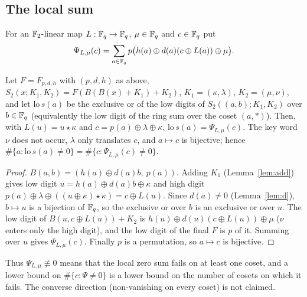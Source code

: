 \subsection{The local sum}
For an $\mathbb{F}_2$-linear map $L:\mathbb{F}_q\to\mathbb{F}_q$, $\mu\in\mathbb{F}_q$ and $c\in\mathbb{F}_q$ put
\[
\Psi_{L,\mu}(c)=\sum_{a\in\mathbb{F}_q}p\bigl(h(a)\oplus d(a)(c\oplus L(a))\oplus\mu\bigr).
\]
\begin{proposition}\label{dz:prop:link}
Let $F=F_{p,d,h}$ with $(p,d,h)$ as above, $S_2(x;K_1,K_2)=F(B(B(x)+K_1)+K_2)$, $K_1=(\kappa,\lambda)$,
$K_2=(\mu,\nu)$, and let $\mathrm{lo}\,s(a)$ be the exclusive or of the low digits of $S_2((a,b);K_1,K_2)$ over
$b\in\mathbb{F}_q$ (equivalently the low digit of the ring sum over the coset $(a,\ast)$). Then, with
$L(u)=u\star\kappa$ and $c=p(a)\oplus\lambda\oplus\kappa$, $\mathrm{lo}\,s(a)=\Psi_{L,\mu}(c)$. The key word $\nu$
does not occur, $\lambda$ only translates $c$, and $a\mapsto c$ is bijective; hence
$\#\{a:\mathrm{lo}\,s(a)\ne0\}=\#\{c:\Psi_{L,\mu}(c)\ne0\}$.
\end{proposition}
\begin{proof}
$B(a,b)=(h(a)\oplus d(a)b,\ p(a))$. Adding $K_1$ (Lemma~\ref{lem:add}) gives low digit
$u=h(a)\oplus d(a)b\oplus\kappa$ and high digit $p(a)\oplus\lambda\oplus((u\oplus\kappa)\star\kappa)=c\oplus L(u)$.
Since $d(a)\ne0$ (Lemma~\ref{lem:d}), $b\mapsto u$ is a bijection of $\mathbb{F}_q$, so the exclusive or over $b$ is
an exclusive or over $u$. The low digit of $B(u,c\oplus L(u))+K_2$ is $h(u)\oplus d(u)(c\oplus L(u))\oplus\mu$
($\nu$ enters only the high digit), and the low digit of the final $F$ is $p$ of it. Summing over $u$
gives $\Psi_{L,\mu}(c)$. Finally $p$ is a permutation, so $a\mapsto c$ is bijective.
\end{proof}
Thus $\Psi_{L,\mu}\not\equiv0$ means that the local zero sum fails on at least one coset, and a lower bound on
$\#\{c:\Psi\ne0\}$ is a lower bound on the number of cosets on which it fails. The converse direction
(non-vanishing on every coset) is not claimed.

